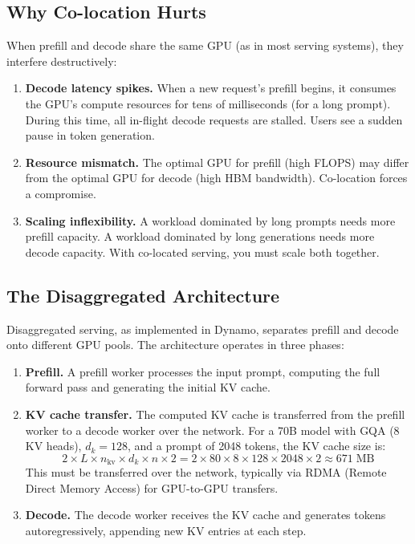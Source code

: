 \subsection{Why Co-location Hurts}

When prefill and decode share the same GPU (as in most serving systems), they interfere destructively:

\begin{enumerate}
\item \textbf{Decode latency spikes.} When a new request's prefill begins, it consumes the GPU's compute resources for tens of milliseconds (for a long prompt). During this time, all in-flight decode requests are stalled. Users see a sudden pause in token generation.
\item \textbf{Resource mismatch.} The optimal GPU for prefill (high FLOPS) may differ from the optimal GPU for decode (high HBM bandwidth). Co-location forces a compromise.
\item \textbf{Scaling inflexibility.} A workload dominated by long prompts needs more prefill capacity. A workload dominated by long generations needs more decode capacity. With co-located serving, you must scale both together.
\end{enumerate}

\subsection{The Disaggregated Architecture}

Disaggregated serving, as implemented in Dynamo, separates prefill and decode onto different GPU pools. The architecture operates in three phases:

\begin{enumerate}
\item \textbf{Prefill.} A prefill worker processes the input prompt, computing the full forward pass and generating the initial KV cache.
\item \textbf{KV cache transfer.} The computed KV cache is transferred from the prefill worker to a decode worker over the network. For a 70B model with GQA (8 KV heads), $d_k = 128$, and a prompt of 2048 tokens, the KV cache size is:
\begin{equation}
\label{eq:kv-transfer}
2 \times L \times n_{\text{kv}} \times d_k \times n \times 2 = 2 \times 80 \times 8 \times 128 \times 2048 \times 2 \approx 671\;\text{MB}
\end{equation}
This must be transferred over the network, typically via RDMA (Remote Direct Memory Access) for GPU-to-GPU transfers.
\item \textbf{Decode.} The decode worker receives the KV cache and generates tokens autoregressively, appending new KV entries at each step.
\end{enumerate}

